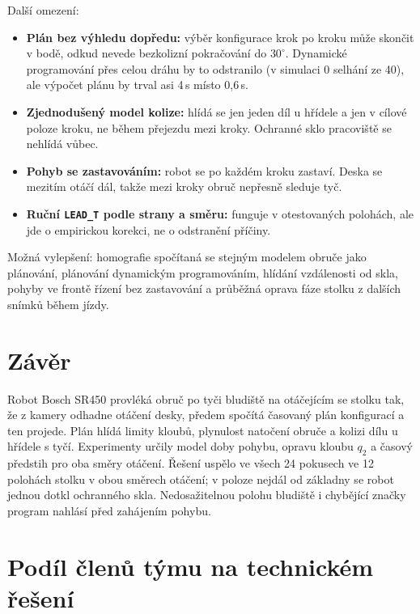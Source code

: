 \documentclass[11pt,a4paper]{article}
\begin{document}
Další omezení:
\begin{itemize}
  \item \textbf{Plán bez výhledu dopředu:} výběr konfigurace krok po kroku může skončit v bodě,
        odkud nevede bezkolizní pokračování do $30^\circ$. Dynamické programování přes celou
        dráhu by to odstranilo (v simulaci 0 selhání ze 40), ale výpočet plánu by trval asi 4\,s
        místo 0{,}6\,s.
  \item \textbf{Zjednodušený model kolize:} hlídá se jen jeden díl u hřídele a jen v cílové
        poloze kroku, ne během přejezdu mezi kroky. Ochranné sklo pracoviště se nehlídá vůbec.
  \item \textbf{Pohyb se zastavováním:} robot se po každém kroku zastaví. Deska se mezitím otáčí
        dál, takže mezi kroky obruč nepřesně sleduje tyč.
  \item \textbf{Ruční \texttt{LEAD\_T} podle strany a směru:} funguje v otestovaných polohách,
        ale jde o empirickou korekci, ne o odstranění příčiny.
\end{itemize}

Možná vylepšení: homografie spočítaná se stejným modelem obruče jako plánování, plánování
dynamickým programováním, hlídání vzdálenosti od skla, pohyby ve frontě řízení bez
zastavování a průběžná oprava fáze stolku z dalších snímků během jízdy.

\section{Závěr}

Robot Bosch SR450 provléká obruč po tyči bludiště na otáčejícím se stolku tak, že z kamery
odhadne otáčení desky, předem spočítá časovaný plán konfigurací a ten projede. Plán hlídá
limity kloubů, plynulost natočení obruče a kolizi dílu u hřídele s tyčí. Experimenty určily
model doby pohybu, opravu kloubu $q_2$ a časový předstih pro oba směry otáčení. Řešení
uspělo ve všech 24 pokusech ve 12 polohách stolku v obou směrech otáčení; v poloze nejdál
od základny se robot jednou dotkl ochranného skla. Nedosažitelnou polohu bludiště i chybějící
značky program nahlásí před zahájením pohybu.

\section{Podíl členů týmu na technickém řešení}
\end{document}
